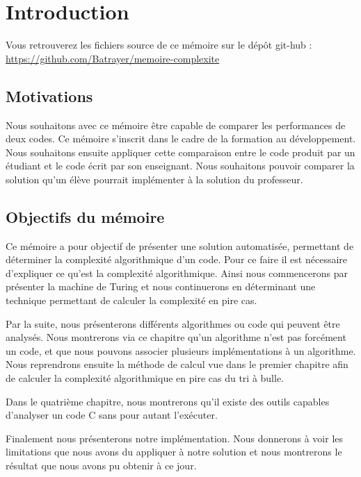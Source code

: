 \documentclass[12pt, twoside, openright]{report}
\begin{document}

\chapter{Introduction}

Vous retrouverez les fichiers source de ce mémoire sur le dépôt git-hub : \url{https://github.com/Batrayer/memoire-complexite}

\section{Motivations}

Nous souhaitons avec ce mémoire être capable de comparer les performances de deux codes. Ce mémoire s'inscrit dans le cadre de la formation au développement. Nous souhaitons ensuite appliquer cette comparaison entre le code produit par un étudiant et le code écrit par son enseignant. Nous souhaitons pouvoir comparer la solution qu'un élève pourrait implémenter à la solution du professeur.

\section{Objectifs du mémoire}

Ce mémoire a pour objectif de présenter une solution automatisée, permettant de déterminer la complexité algorithmique d'un code. Pour ce faire il est nécessaire d'expliquer ce qu'est la complexité algorithmique. Ainsi nous commencerons par présenter la machine de Turing et nous continuerons en déterminant une technique permettant de calculer la complexité en pire cas. 

Par la suite, nous présenterons différents algorithmes ou code qui peuvent être analysés. Nous montrerons via ce chapitre qu'un algorithme n'est pas forcément un code, et que nous pouvons associer plusieurs implémentations à un algorithme. Nous reprendrons ensuite la méthode de calcul vue dans le premier chapitre afin de calculer la complexité algorithmique en pire cas du tri à bulle.

Dans le quatrième chapitre, nous montrerons qu'il existe des outils capables d'analyser un code C sans pour autant l'exécuter. 

Finalement nous présenterons notre implémentation. Nous donnerons à voir les limitations que nous avons du appliquer à notre solution et nous montrerons le résultat que nous avons pu obtenir à ce jour. 
\end{document}
